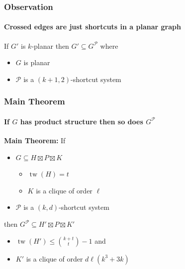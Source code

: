 \documentclass[xcolor=dvipsnames]{beamer}
\DeclareMathOperator{\tw}{tw}
\begin{document}
\begin{frame}
    \frametitle{Observation}
    \framesubtitle{Crossed edges are just shortcuts in a planar graph}

    If $G'$ is $k$-planar then $G'\subseteq G^{\mathcal{P}}$ where
    \begin{itemize}
        \item $G$ is planar
        \item $\mathcal{P}$ is a $(k+1,2)$-shortcut system
    \end{itemize}
    \begin{center}
    \end{center}
\end{frame}

\begin{frame}
    \frametitle{Main Theorem}
    \framesubtitle{If $G$ has product structure then so does $G^{\mathcal{P}}$}
    \textbf{Main Theorem:} If
    \begin{itemize}
        \item $G\subseteq H\boxtimes P\boxtimes K$
        \begin{itemize}
            \item $\tw(H)=t$
            \item $K$ is a clique of order $\ell$
        \end{itemize}
        \item $\mathcal{P}$ is a $(k,d)$-shortcut system
    \end{itemize}
    then $G^\mathcal{P}\subseteq H'\boxtimes P\boxtimes K'$
    \begin{itemize}
        \item $\tw(H') \le \binom{k+t}{t}-1$ and
        \item $K'$ is a clique of order $d\ell(k^3+3k)$
    \end{itemize}
\end{frame}
\end{document}
